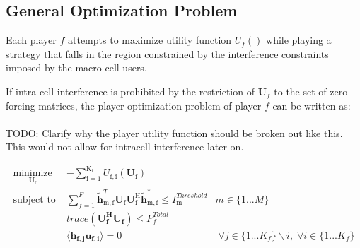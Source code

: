 \documentclass[12pt]{article}
\begin{document}
%
%


\subsection{General Optimization Problem}

Each player $f$ attempts to maximize utility function $U_f()$ while playing a strategy that falls in the region constrained by the interference constraints imposed by the macro cell users.
\par

If intra-cell interference is  prohibited by the restriction of $\mathbf{U}_f$ to the set of zero-forcing matrices, the player optimization problem of player $f$ can be written as:
\\\\
TODO: Clarify why the player utility function should be broken out like this. This would not allow for intracell interference later on. 

	
	\begin{subequations}
	\label{optim}
	\begin{align}
	    \underset{\mathbf{U}_{\mathrm{f}} }{\text{minimize}} \;
	    & - \sum_{\mathrm{i=1}}^{\mathrm{K_f}}
    	U_{\mathrm{f,i}}(\mathbf{U}_{\mathrm{f}}) \label{player_opt} \\
	    \text{subject to} \; &
	   \sum^F_{f=1} \mathbf{\tilde{h}}_{\mathrm{m,f}}^T  \mathbf{U_{\mathrm{f}}}		
	\mathbf{U_{\mathrm{f}}^{\mathrm{H}}} \mathbf{\tilde{h}_{\mathrm{m,f}}^*} \leq I^{Threshold}		
	_{\mathrm{m}} & m \in \{1 ...M\} 
		\label{interference_const}\\
        & trace(\mathbf{U_f^H}\mathbf{U_f}) \leq P^{Total}_{f} \label{power_const}\\
        & \langle \mathbf{h_{f,j}}\mathbf{u_{f,i}} \rangle =0\ & \; \forall j \in \{1... K_f\}\backslash i ,\; \forall i \in \{1 ... K_f\} \label{zf_const}
	\end{align}
	\end{subequations}
\end{document}
